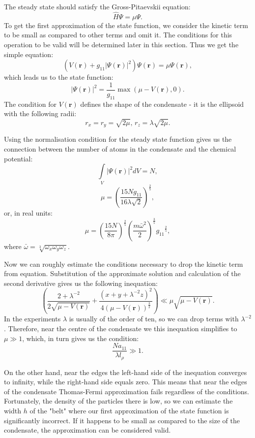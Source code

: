 \documentclass[12pt,notitlepage]{report}
\begin{document}
The steady state should satisfy the Gross-Pitaevskii equation:
\[ \hat{H} \Psi = \mu \Psi. \]
To get the first approximation of the state function, we consider the kinetic term to be small as compared to other terms and omit it. The conditions for this operation to be valid will be determined later in this section. Thus we get the simple equation:
\[ \left( V(\mathbf{r}) + g_{11} \vert \Psi(\mathbf{r}) \vert^2 \right) \Psi(\mathbf{r}) = \mu \Psi(\mathbf{r}), \]
which leads us to the state function:
\[ \vert \Psi(\mathbf{r}) \vert^2 = \frac{1}{g_{11}} \max \left( \mu - V(\mathbf{r}), 0 \right). \]
The condition for $V(\mathbf{r})$ defines the shape of the condensate - it is the ellipsoid with the following radii:
\[ r_x = r_y = \sqrt{2\mu},\, r_z = \lambda \sqrt{2\mu}. \]

Using the normalisation condition for the steady state function gives us the connection between the number of atoms in the condensate and the chemical potential:
\[ \int\limits_{V} \vert \Psi(\mathbf{r}) \vert^2 dV = N, \]
\[ \mu = \left( \frac{15 N g_{11}}{16 \lambda \sqrt{2}} \right)^{\frac{2}{5}}, \]
or, in real units:
\[ 
\mu = \left( \frac{15 N}{8 \pi} \right)^\frac{2}{5} 
\left( \frac{m \bar{\omega}^2}{2} \right)^\frac{3}{5}
{g_{11}}^\frac{2}{5},
\]
where $\bar{\omega} = \sqrt[3]{\omega_x \omega_y \omega_z}$.

Now we can roughly estimate the conditions necessary to drop the kinetic term from equation. Substitution of the approximate solution and calculation of the second derivative gives us the following inequation:
\[
\left( 
	\frac{2 + \lambda^{-2}}{2 \sqrt{\mu - V(\mathbf{r})}} +
	\frac{\left( x + y + \lambda^{-2}z \right)^2}{4 \left( \mu - V(\mathbf{r}) \right)^{\frac{3}{2}}} 
\right) \ll
\mu \sqrt{\mu - V(\mathbf{r})}.
\]
In the experiments $\lambda$ is usually of the order of ten, so we can drop terms with $\lambda^{-2}$. Therefore, near the centre of the condensate we this inequation simplifies to $\mu \gg 1$, which, in turn gives us the condition:
\[ \frac{N a_{11}}{\lambda l_\rho} \gg 1. \]

On the other hand, near the edges the left-hand side of the inequation converges to infinity, while the right-hand side equals zero. This means that near the edges of the condensate Thomas-Fermi approximation fails regardless of the conditions. Fortunately, the density of the particles there is low, so we can estimate the width $h$ of the "belt" where our first approximation of the state function is significantly incorrect. If it happens to be small as compared to the size of the condensate, the approximation can be considered valid.
\end{document}
